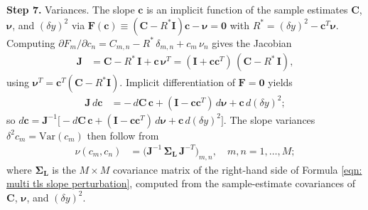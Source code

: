 \documentclass[twoside]{article}
\numberwithin{equation}{section}
\begin{document}
\textbf{Step 7.} Variances. The slope $\mathbf{c}$ is an implicit function of the sample estimates $\mathbf{C}$, $\boldsymbol{\nu}$, and $(\delta y)^2$ via $\mathbf{F}(\mathbf{c}) \equiv (\mathbf{C} - R^*\mathbf{I})\mathbf{c} - \boldsymbol{\nu} = \mathbf{0}$ with $R^* = (\delta y)^2 - \mathbf{c}^T \boldsymbol{\nu}$. Computing $\partial F_m/\partial c_n = C_{m,n} - R^*\, \delta_{m,n} + c_m\, \nu_n$ gives the Jacobian
\begin{align}
\label{eqn: multi tls Jacobian}
\mathbf{J} &= \mathbf{C} - R^*\, \mathbf{I} + \mathbf{c}\, \boldsymbol{\nu}^T = (\mathbf{I} + \mathbf{c}\mathbf{c}^T)\, (\mathbf{C} - R^*\, \mathbf{I}),
\end{align}
using $\boldsymbol{\nu}^T = \mathbf{c}^T(\mathbf{C} - R^*\mathbf{I})$. Implicit differentiation of $\mathbf{F} = \mathbf{0}$ yields
\begin{align}
\label{eqn: multi tls slope perturbation}
\mathbf{J}\, d\mathbf{c} &= -\, d\mathbf{C}\, \mathbf{c} + (\mathbf{I} - \mathbf{c}\mathbf{c}^T)\, d\boldsymbol{\nu} + \mathbf{c}\, d(\delta y)^2;
\end{align}
so $d\mathbf{c} = \mathbf{J}^{-1}\bigl[ -d\mathbf{C}\, \mathbf{c} + (\mathbf{I} - \mathbf{c}\mathbf{c}^T)\, d\boldsymbol{\nu} + \mathbf{c}\, d(\delta y)^2 \bigr]$. The slope variances $\delta^2 c_m = \mathrm{Var}(c_m)$ then follow from
\begin{align}
\label{eqn: multi tls slope variance}
\nu(c_m, c_n) &= \bigl( \mathbf{J}^{-1}\, \boldsymbol{\Sigma}_{\mathbf{L}}\, \mathbf{J}^{-T} \bigr)_{m, n}, \quad m, n = 1, \dots, M;
\end{align}
where $\boldsymbol{\Sigma}_{\mathbf{L}}$ is the $M \times M$ covariance matrix of the right-hand side of Formula \eqref{eqn: multi tls slope perturbation}, computed from the sample-estimate covariances of $\mathbf{C}$, $\boldsymbol{\nu}$, and $(\delta y)^2$.
\end{document}
